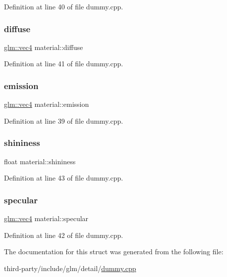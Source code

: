 Definition at line 40 of file dummy.\+cpp.

\mbox{\label{structmaterial_a506a0cc33282fa76872c6aeebd688b39}} 
\subsubsection{\texorpdfstring{diffuse}{diffuse}}
{\footnotesize\ttfamily \hyperlink{group__core__types_ga5881b1b022d7fd1b7218f5916532dd02}{glm\+::vec4} material\+::diffuse}



Definition at line 41 of file dummy.\+cpp.

\mbox{\label{structmaterial_a76b696726a2ea73e6840001821942bc3}} 
\subsubsection{\texorpdfstring{emission}{emission}}
{\footnotesize\ttfamily \hyperlink{group__core__types_ga5881b1b022d7fd1b7218f5916532dd02}{glm\+::vec4} material\+::emission}



Definition at line 39 of file dummy.\+cpp.

\mbox{\label{structmaterial_aa3740fd7908ec5a11bbc4a4bd5b21abc}} 
\subsubsection{\texorpdfstring{shininess}{shininess}}
{\footnotesize\ttfamily float material\+::shininess}



Definition at line 43 of file dummy.\+cpp.

\mbox{\label{structmaterial_a452d07b4570da7204caeaf798cd01a77}} 
\subsubsection{\texorpdfstring{specular}{specular}}
{\footnotesize\ttfamily \hyperlink{group__core__types_ga5881b1b022d7fd1b7218f5916532dd02}{glm\+::vec4} material\+::specular}



Definition at line 42 of file dummy.\+cpp.



The documentation for this struct was generated from the following file\+:\begin{DoxyCompactItemize}
\item 
third-\/party/include/glm/detail/\hyperlink{dummy_8cpp}{dummy.\+cpp}\end{DoxyCompactItemize}
